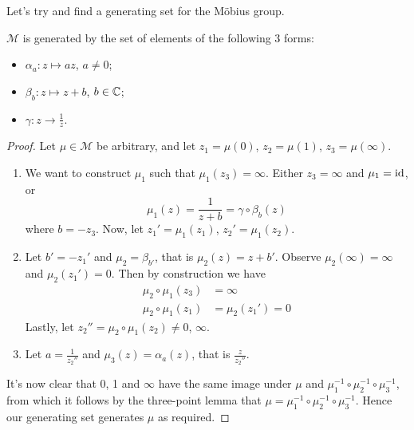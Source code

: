 \documentclass{../template/note}
\begin{document}

    Let's try and find a generating set for the M\"obius group.
    
    \begin{proposition}
        \(\mathcal M\) is generated by the set of elements of the following 3 forms:
        \begin{itemize}
            \item \(\alpha_a: z \mapsto az\), \(a \neq 0\);
            \item \(\beta_b: z \mapsto z + b\), \(b \in \mathbb C\);
            \item \(\gamma: z \to \frac{1}{z}\).
        \end{itemize}
        \label{generators-mobius-group}
    \end{proposition}
    
    \begin{proof}
        Let \(\mu \in \mathcal M\) be arbitrary, and let \(z_1 = \mu(0)\), \(z_2 = \mu(1)\), \(z_3 = \mu(\infty)\).
        \begin{enumerate}[label=\protect\circled{\arabic*}]
            \item We want to construct \(\mu_1\) such that \(\mu_1(z_3) = \infty\). Either \(z_3 = \infty\) and \(\mu_1 = \operatorname{id}\), or
            \[
                \mu_1(z) = \frac{1}{z+b} = \gamma \circ \beta_b(z)
            \]
            where \(b = -z_3\). Now, let \(z_1' = \mu_1(z_1)\), \(z_2' = \mu_1(z_2)\).
            \item Let \(b' = -z_1'\) and \(\mu_2 = \beta_{b'}\), that is \(\mu_2(z) = z + b'\). Observe \(\mu_2(\infty) = \infty\) and \(\mu_2(z_1') = 0\). Then by construction we have
            \begin{align*}
                \mu_2 \circ \mu_1 (z_3) &= \infty \\
                \mu_2 \circ \mu_1 (z_1) &= \mu_2(z_1') = 0
            \end{align*}
            Lastly, let \(z_2'' = \mu_2 \circ \mu_1(z_2) \neq 0\), \(\infty\).
            \item Let \(a = \frac{1}{z_2''}\) and \(\mu_3(z) = \alpha_a(z)\), that is \(\frac{z}{z_2''}\).
        \end{enumerate}
        It's now clear that 0, 1 and \(\infty\) have the same image under \(\mu\) and \(\mu_1^{-1} \circ \mu_2^{-1} \circ \mu_3^{-1}\), from which it follows by the three-point lemma that \(\mu = \mu_1^{-1} \circ \mu_2^{-1} \circ \mu_3^{-1}\). Hence our generating set generates \(\mu\) as required.
    \end{proof}
    
\end{document}

